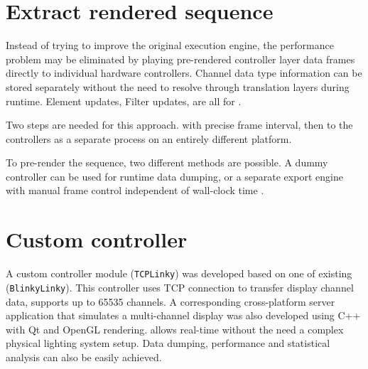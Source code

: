 \section{Extract rendered sequence}

Instead of trying to improve the original execution engine, the performance problem may be eliminated by playing pre-rendered controller layer data frames directly to individual hardware controllers. Channel data type information can be stored separately without the need to resolve through translation layers during runtime. Element updates, Filter updates,  are all  for .

Two steps are needed for this approach.  with precise frame interval, then  to the controllers as a separate process on an entirely different platform.

To pre-render the sequence, two different methods are possible. A dummy controller can be used for runtime data dumping, or a separate export engine with manual frame control independent of wall-clock time . 

\section{Custom controller}
\label{sec:tcplinky}


A custom controller module (\texttt{TCPLinky}) was developed based on one of  existing  (\texttt{BlinkyLinky}). This controller uses TCP connection to transfer display channel data,  supports up to 65535 channels. A corresponding cross-platform server application that simulates a multi-channel display was also developed using C++ with Qt \cite{qt} and OpenGL \cite{shreiner2009opengl} rendering.  allows real-time  without the need  a complex physical lighting system setup. Data dumping, performance and statistical analysis can also be easily achieved.

